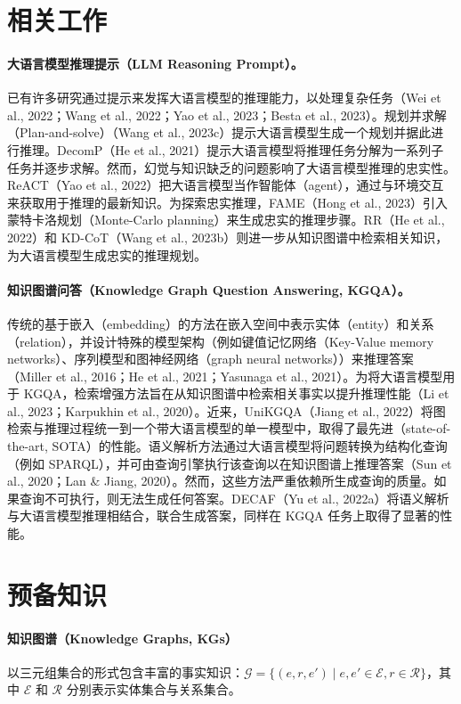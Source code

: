 \documentclass[11pt,UTF8,fontset=fandol]{ctexart}
\begin{document}
\section{相关工作}

\paragraph{大语言模型推理提示（LLM Reasoning Prompt）。}
已有许多研究通过提示来发挥大语言模型的推理能力，以处理复杂任务（Wei et al., 2022；Wang et al., 2022；Yao et al., 2023；Besta et al., 2023）。规划并求解（Plan-and-solve）（Wang et al., 2023c）提示大语言模型生成一个规划并据此进行推理。DecomP（He et al., 2021）提示大语言模型将推理任务分解为一系列子任务并逐步求解。然而，幻觉与知识缺乏的问题影响了大语言模型推理的忠实性。ReACT（Yao et al., 2022）把大语言模型当作智能体（agent），通过与环境交互来获取用于推理的最新知识。为探索忠实推理，FAME（Hong et al., 2023）引入蒙特卡洛规划（Monte-Carlo planning）来生成忠实的推理步骤。RR（He et al., 2022）和 KD-CoT（Wang et al., 2023b）则进一步从知识图谱中检索相关知识，为大语言模型生成忠实的推理规划。

\paragraph{知识图谱问答（Knowledge Graph Question Answering, KGQA）。}
传统的基于嵌入（embedding）的方法在嵌入空间中表示实体（entity）和关系（relation），并设计特殊的模型架构（例如键值记忆网络（Key-Value memory networks）、序列模型和图神经网络（graph neural networks））来推理答案（Miller et al., 2016；He et al., 2021；Yasunaga et al., 2021）。为将大语言模型用于 KGQA，检索增强方法旨在从知识图谱中检索相关事实以提升推理性能（Li et al., 2023；Karpukhin et al., 2020）。近来，UniKGQA（Jiang et al., 2022）将图检索与推理过程统一到一个带大语言模型的单一模型中，取得了最先进（state-of-the-art, SOTA）的性能。语义解析方法通过大语言模型将问题转换为结构化查询（例如 SPARQL），并可由查询引擎执行该查询以在知识图谱上推理答案（Sun et al., 2020；Lan \& Jiang, 2020）。然而，这些方法严重依赖所生成查询的质量。如果查询不可执行，则无法生成任何答案。DECAF（Yu et al., 2022a）将语义解析与大语言模型推理相结合，联合生成答案，同样在 KGQA 任务上取得了显著的性能。

\section{预备知识}

\paragraph{知识图谱（Knowledge Graphs, KGs）}
以三元组集合的形式包含丰富的事实知识：$\mathcal{G} = \{(e, r, e') \mid e, e' \in \mathcal{E}, r \in \mathcal{R}\}$，其中 $\mathcal{E}$ 和 $\mathcal{R}$ 分别表示实体集合与关系集合。
\end{document}
